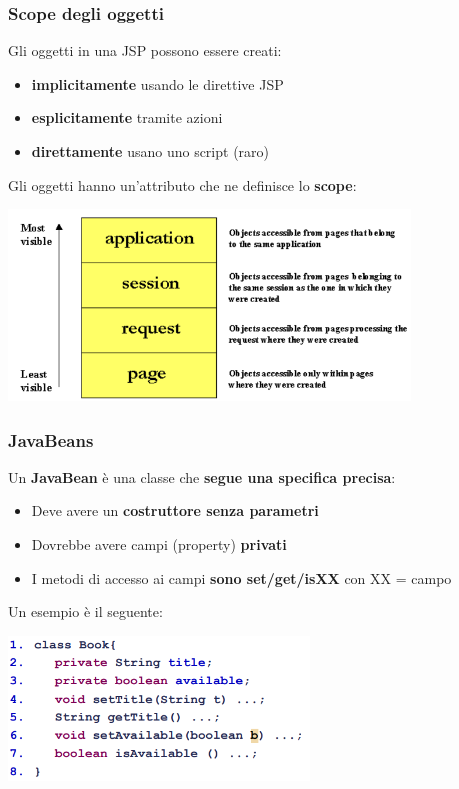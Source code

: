\documentclass[12pt]{article}
\begin{document}
\subsubsection{Scope degli oggetti}
Gli oggetti in una JSP possono essere creati:
\begin{itemize}
    \item \textbf{implicitamente} usando le direttive JSP
    \item \textbf{esplicitamente} tramite azioni
    \item \textbf{direttamente} usano uno script (raro)
\end{itemize}
Gli oggetti hanno un'attributo che ne definisce lo \textbf{scope}:
\begin{center}
    \includegraphics[width = 0.80\textwidth]{Images/202.png}
\end{center}
\subsubsection{JavaBeans}
Un \textbf{JavaBean} è una classe che \textbf{segue una specifica precisa}:
\begin{itemize}
    \item Deve avere un \textbf{costruttore senza parametri}
    \item Dovrebbe avere campi (property) \textbf{privati}
    \item I metodi di accesso ai campi \textbf{sono set/get/isXX} con XX = campo
\end{itemize}
Un esempio è il seguente:
\begin{center}
    \includegraphics[width = 0.60\textwidth]{Images/203.png}
\end{center}
\end{document}
